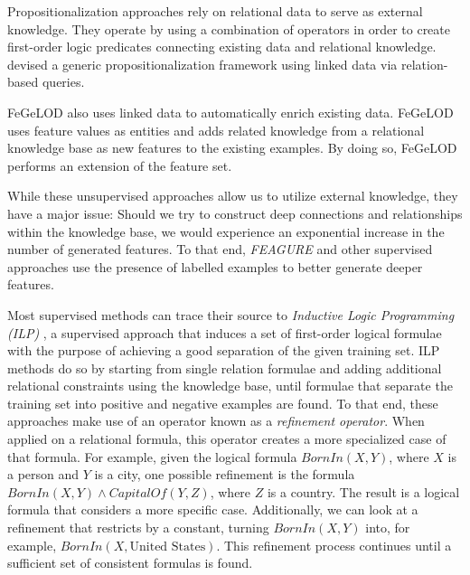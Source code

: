 \documentclass[twoside,11pt]{article}
\theoremstyle{definition}
\begin{document}
	 Propositionalization approaches  rely on relational data to serve as external knowledge. They operate by using a combination of operators in order to create first-order logic predicates connecting existing data and relational knowledge. 
	 devised a generic propositionalization framework  using linked data via relation-based queries. 
	
	 FeGeLOD \cite{paulheim2012unsupervisedfull} also uses linked data to automatically enrich existing data. 
	FeGeLOD uses feature values as entities and adds related knowledge from a relational knowledge base as new features to the existing examples. By doing so, FeGeLOD performs an extension of the feature set.
	
	While these unsupervised approaches allow us to utilize external knowledge, they have a major issue: Should we try to construct deep connections and relationships within the knowledge base, we would experience an exponential increase in the number of generated features.
	To that end, \emph{FEAGURE} and other supervised approaches use the presence of labelled examples to better generate deeper features.
	
	Most supervised methods can trace their source to \emph{Inductive Logic Programming (ILP)} \cite{muggleton1991inductive}, a supervised approach that induces a set of first-order logical formulae with the purpose of achieving a good separation of the given training set. 
	ILP methods do so by starting from single relation formulae and adding additional relational constraints using the knowledge base, until formulae that separate the training set into positive and negative examples are found. To that end, these approaches make use of an operator known as a \emph{refinement operator}. When applied on a relational formula, this operator creates a more specialized case of that formula. For example, given the logical formula $BornIn(X,Y)$, where $X$ is a person and $Y$ is a city, one possible refinement is the formula $BornIn(X,Y)\land CapitalOf(Y,Z)$, where $Z$ is a country. The result is a logical formula that considers a more specific case. Additionally, we can look at a refinement that restricts by a constant, turning $BornIn(X,Y)$ into, for example, $BornIn(X, \mbox{{United States}})$. This refinement process continues until a sufficient set of consistent formulas is found. 
\end{document}
